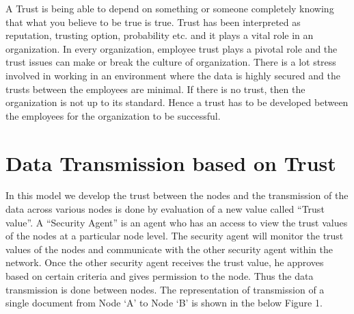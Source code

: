 A Trust is being able to depend on something or someone completely knowing that
what you believe to be true is true. Trust has been interpreted as reputation,
trusting option, probability etc. \autocite{Liu2006} and it plays a vital role in an
organization.  In every organization, employee trust plays a pivotal role and
the trust issues can make or break the culture of organization. There is a lot
stress involved in working in an environment where the data is highly secured
and the trusts between the employees are minimal.  If there is no trust, then
the organization is not up to its standard. Hence a trust has to be developed
between the employees for the organization to be successful. 

\section{Data Transmission based on Trust}
In this model we develop the trust between the nodes and the transmission of the
data across various nodes is done by evaluation of a new value called “Trust
value”. A “Security Agent” is an agent who has an access to view the trust
values of the nodes at a particular node level. The security agent will monitor
the trust values of the nodes and communicate with the other security agent
within the network. Once the other security agent receives the trust value, he
approves based on certain criteria and gives permission to the node. Thus the
data transmission is done between nodes. The representation of transmission of
a single document from Node ‘A' to Node ‘B' is shown in the below Figure 1.


